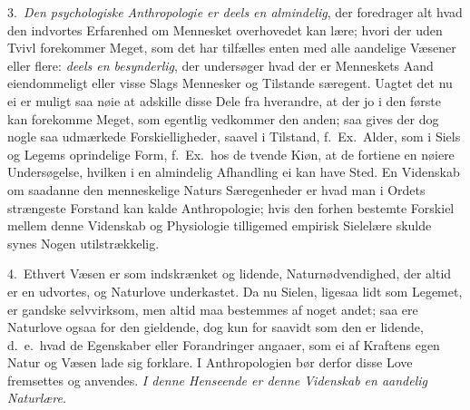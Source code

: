 \documentclass[12pt,a4paper]{article}
\newcommand{\opage}[1]{\marginnote{\footnotesize\textit{[#1]}}}
\begin{document}
\opage{3} 3.~\emph{Den psychologiske Anthropologie er deels en almindelig}, der
foredrager alt hvad den indvortes Erfarenhed om Mennesket overhovedet kan lære;
hvori der uden Tvivl forekommer Meget, som det har tilfælles enten med alle
aandelige Væsener eller flere: \emph{deels en besynderlig}, der undersøger hvad
der er Menneskets Aand eiendommeligt eller visse Slags Mennesker og Tilstande
særegent. Uagtet det nu ei er muligt saa nøie at adskille disse Dele fra
hverandre, at der jo i den første kan forekomme Meget, som egentlig vedkommer den
anden; saa gives der dog nogle saa udmærkede Forskielligheder, saavel i Tilstand,
f.~Ex.\ Alder, som i Siels og Legems oprindelige Form, f.~Ex.\ hos de tvende Kiøn,
at de fortiene en nøiere Undersøgelse, hvilken i en almindelig Afhandling ei kan
have Sted. En Videnskab om saadanne den menneskelige Naturs Særegenheder er hvad
man i Ordets strængeste Forstand kan kalde Anthropologie; hvis den forhen
bestemte Forskiel mellem denne Videnskab og Physiologie tilligemed empirisk
Sielelære skulde synes Nogen utilstrækkelig.

4.~Ethvert Væsen er som indskrænket og lidende, Naturnødvendighed, der altid er
en udvortes, og Naturlove underkastet. Da nu Sielen, ligesaa lidt som Legemet, er
\opage{4} gandske selvvirksom, men altid maa bestemmes af noget andet; saa ere Naturlove
ogsaa for den gieldende, dog kun for saavidt som den er lidende, d.~e.\ hvad de
Egenskaber eller Forandringer angaaer, som ei af Kraftens egen Natur og Væsen
lade sig forklare. I Anthropologien bør derfor disse Love fremsettes og anvendes.
\emph{I denne Henseende er denne Videnskab en aandelig Naturlære.}
\end{document}

